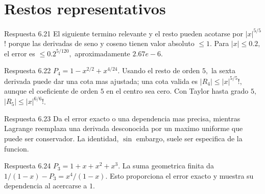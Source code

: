 \documentclass[10pt,a4paper,oneside,openany]{book}
\begin{document}
\section{Restos representativos}
\begin{PSevenAnswerFixed}{Respuesta 6.21}
El siguiente termino relevante y el resto pueden acotarse por \(|x|^{5/5}\)! porque las derivadas de seno y coseno tienen valor absoluto \(\le 1\). Para \(|x|\le 0.2,\) el error es \(\le 0.2^{5/120},\) aproximadamente \(2.67e-6\).
\end{PSevenAnswerFixed}
\begin{PSevenAnswerFixed}{Respuesta 6.22}
\(P_4=1-x^{2/2}+x^{4/24}\). Usando el resto de orden \(5,\) la sexta derivada puede dar una cota mas ajustada; una cota valida es \(|R_4|\le |x|^{5/5}!,\) aunque el coeficiente de orden \(5\) en el centro sea cero. Con Taylor hasta grado \(5,\) \(|R_5|\le |x|^{6/6}!\).
\end{PSevenAnswerFixed}
\begin{PSevenAnswerFixed}{Respuesta 6.23}
Da el error exacto o una dependencia mas precisa, mientras Lagrange reemplaza una derivada desconocida por un maximo uniforme que puede ser conservador. La identidad, \(\sin\) embargo, suele ser especifica de la funcion.
\end{PSevenAnswerFixed}
\begin{PSevenAnswerFixed}{Respuesta 6.24}
\(P_3=1+x+x^{2}+x^{3}\). La suma geometrica finita da \(1/(1-x)-P_3=x^{4}/(1-x)\). Esto proporciona el error exacto y muestra su dependencia al acercarse a \(1\).
\end{PSevenAnswerFixed}
\end{document}
